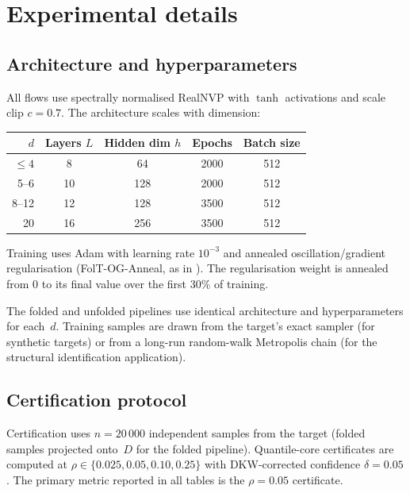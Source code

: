 \section{Experimental details}
\label{app:experiments}

\subsection{Architecture and hyperparameters}
\label{app:hyperparams}

All flows use spectrally normalised RealNVP with $\tanh$
activations and scale clip $c = 0.7$.  The architecture scales
with dimension:

\begin{center}
\begin{tabular}{rcccc}
\hline
$d$ & Layers $L$ & Hidden dim $h$ & Epochs & Batch size \\
\hline
$\leq 4$ & 8  & 64  & 2000 & 512 \\
5--6     & 10 & 128 & 2000 & 512 \\
8--12    & 12 & 128 & 3500 & 512 \\
20       & 16 & 256 & 3500 & 512 \\
\hline
\end{tabular}
\end{center}

Training uses Adam with learning rate $10^{-3}$ and annealed
oscillation/gradient regularisation (FolT-OG-Anneal, as in
\citealt{CerTMCMC}).  The regularisation weight is annealed from
$0$ to its final value over the first $30\%$ of training.

The folded and unfolded pipelines use identical architecture
and hyperparameters for each~$d$.  Training samples are drawn
from the target's exact sampler (for synthetic targets) or from
a long-run random-walk Metropolis chain (for the structural
identification application).

\subsection{Certification protocol}
\label{app:cert_protocol}

Certification uses $n = 20\,000$ independent samples from the
target (folded samples projected onto~$D$ for the folded
pipeline).  Quantile-core certificates are computed at
$\rho \in \{0.025, 0.05, 0.10, 0.25\}$ with DKW-corrected
confidence $\delta = 0.05$.  The primary metric reported in
all tables is the $\rho = 0.05$ certificate.

